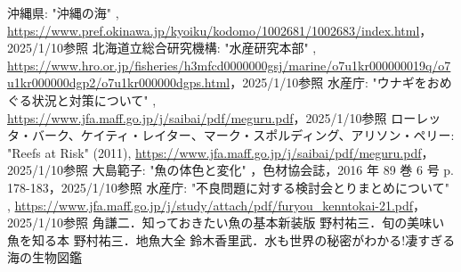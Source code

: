 \documentclass[12pt,a4j,titlepage]{ltjsarticle}
\begin{document}
\begin{thebibliography}{99}
  沖縄県: "沖縄の海" , \url{https://www.pref.okinawa.jp/kyoiku/kodomo/1002681/1002683/index.html}，2025/1/10参照
  北海道立総合研究機構: "水産研究本部" , \url{https://www.hro.or.jp/fisheries/h3mfcd0000000gsj/marine/o7u1kr000000019q/o7u1kr000000dgp2/o7u1kr000000dgps.html}，2025/1/10参照
  水産庁: "ウナギをおめぐる状況と対策について" , \url{https://www.jfa.maff.go.jp/j/saibai/pdf/meguru.pdf}，2025/1/10参照
  ローレッタ・バーク、ケイティ・レイター、マーク・スポルディング、アリソン・ペリー: "Reefs at Risk" (2011), \url{https://www.jfa.maff.go.jp/j/saibai/pdf/meguru.pdf}，2025/1/10参照
  大島範子: "魚の体色と変化"  ，色材協会誌，2016 年 89 巻 6 号 p. 178-183，2025/1/10参照
  水産庁: "不良問題に対する検討会とりまとめについて" , \url{https://www.jfa.maff.go.jp/j/study/attach/pdf/furyou_kenntokai-21.pdf}，2025/1/10参照
 角謙二．知っておきたい魚の基本新装版
\bibitem{} 野村祐三．旬の美味い魚を知る本
\bibitem{} 野村祐三．地魚大全
 鈴木香里武．水も世界の秘密がわかる!凄すぎる海の生物図鑑
\end{thebibliography}
\end{document}
